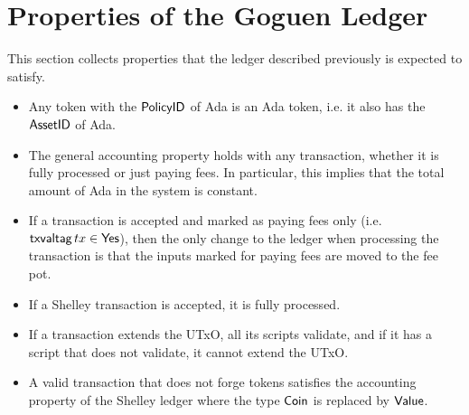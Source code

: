 \section{Properties of the Goguen Ledger}
\label{sec:properties}

This section collects properties that the ledger described previously
is expected to satisfy.

\begin{itemize}
\item Any token with the $\mathsf{PolicyID}$ of Ada is an Ada token, i.e. it
  also has the $\mathsf{AssetID}$ of Ada.
\item The general accounting property holds with any transaction,
  whether it is fully processed or just paying fees. In particular,
  this implies that the total amount of Ada in the system is constant.
\item If a transaction is accepted and marked as paying fees only
  (i.e. $\mathsf{txvaltag}\, tx \in \mathsf{Yes}$), then the only change to the ledger
  when processing the transaction is that the inputs marked for paying
  fees are moved to the fee pot.
\item If a Shelley transaction is accepted, it is fully processed.
\item If a transaction extends the UTxO, all its scripts validate, and
  if it has a script that does not validate, it cannot extend the
  UTxO.
\item A valid transaction that does not forge tokens satisfies the
  accounting property of the Shelley ledger where the type $\mathsf{Coin}$ is
  replaced by $\mathsf{Value}$.
\end{itemize}
